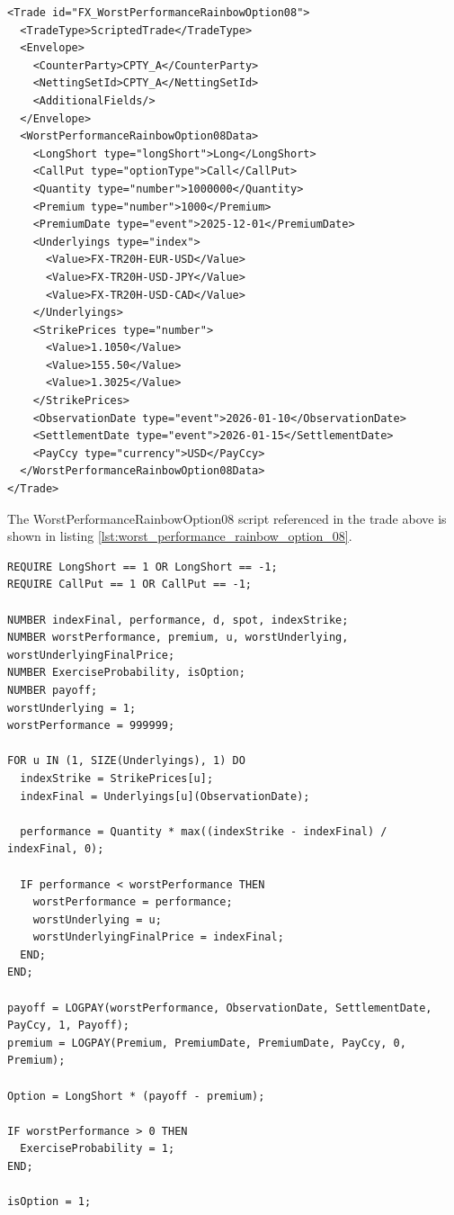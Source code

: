 \begin{verbatim}
<Trade id="FX_WorstPerformanceRainbowOption08">
  <TradeType>ScriptedTrade</TradeType>
  <Envelope>
    <CounterParty>CPTY_A</CounterParty>
    <NettingSetId>CPTY_A</NettingSetId>
    <AdditionalFields/>
  </Envelope>
  <WorstPerformanceRainbowOption08Data>
    <LongShort type="longShort">Long</LongShort>
    <CallPut type="optionType">Call</CallPut>
    <Quantity type="number">1000000</Quantity>
    <Premium type="number">1000</Premium>
    <PremiumDate type="event">2025-12-01</PremiumDate>
    <Underlyings type="index">
      <Value>FX-TR20H-EUR-USD</Value>
      <Value>FX-TR20H-USD-JPY</Value>
      <Value>FX-TR20H-USD-CAD</Value>
    </Underlyings>
    <StrikePrices type="number">
      <Value>1.1050</Value>
      <Value>155.50</Value>
      <Value>1.3025</Value>
    </StrikePrices>
    <ObservationDate type="event">2026-01-10</ObservationDate>
    <SettlementDate type="event">2026-01-15</SettlementDate>
    <PayCcy type="currency">USD</PayCcy>
  </WorstPerformanceRainbowOption08Data>
</Trade>
\end{verbatim}

The WorstPerformanceRainbowOption08 script referenced in the trade above is shown in listing
\ref{lst:worst_performance_rainbow_option_08}.

\begin{listing}[hbt]
\begin{verbatim}
REQUIRE LongShort == 1 OR LongShort == -1;
REQUIRE CallPut == 1 OR CallPut == -1;

NUMBER indexFinal, performance, d, spot, indexStrike;
NUMBER worstPerformance, premium, u, worstUnderlying, worstUnderlyingFinalPrice;
NUMBER ExerciseProbability, isOption;
NUMBER payoff;
worstUnderlying = 1;
worstPerformance = 999999;

FOR u IN (1, SIZE(Underlyings), 1) DO
  indexStrike = StrikePrices[u];
  indexFinal = Underlyings[u](ObservationDate);

  performance = Quantity * max((indexStrike - indexFinal) / indexFinal, 0);

  IF performance < worstPerformance THEN
    worstPerformance = performance;
    worstUnderlying = u;
    worstUnderlyingFinalPrice = indexFinal;
  END;
END;

payoff = LOGPAY(worstPerformance, ObservationDate, SettlementDate, PayCcy, 1, Payoff);
premium = LOGPAY(Premium, PremiumDate, PremiumDate, PayCcy, 0, Premium);

Option = LongShort * (payoff - premium);

IF worstPerformance > 0 THEN
  ExerciseProbability = 1;
END;

isOption = 1;
\end{verbatim}
\caption{Payoff script for a WorstPerformanceRainbowOption08.}
\label{lst:worst_performance_rainbow_option_08}
\end{listing}

